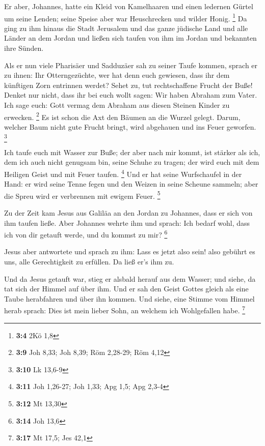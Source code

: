  Er aber, Johannes, hatte ein Kleid von Kamelhaaren und
einen ledernen Gürtel um seine Lenden; seine Speise aber war
Heuschrecken und wilder Honig. \footnote{\textbf{3:4} 2Kö 1,8}
 Da ging zu ihm hinaus die Stadt Jerusalem und das ganze
jüdische Land und alle Länder an dem Jordan  und ließen
sich taufen von ihm im Jordan und bekannten ihre Sünden.

 Als er nun viele Pharisäer und Sadduzäer sah zu seiner
Taufe kommen, sprach er zu ihnen: Ihr Otterngezüchte, wer hat denn euch
gewiesen, dass ihr dem künftigen Zorn entrinnen werdet? 
Sehet zu, tut rechtschaffene Frucht der Buße!  Denket nur
nicht, dass ihr bei euch wollt sagen: Wir haben Abraham zum Vater. Ich
sage euch: Gott vermag dem Abraham aus diesen Steinen Kinder zu
erwecken. \footnote{\textbf{3:9} Joh 8,33; Joh 8,39; Röm 2,28-29; Röm
  4,12}  Es ist schon die Axt den Bäumen an die Wurzel
gelegt. Darum, welcher Baum nicht gute Frucht bringt, wird abgehauen und
ins Feuer geworfen. \footnote{\textbf{3:10} Lk 13,6-9}

 Ich taufe euch mit Wasser zur Buße; der aber nach mir
kommt, ist stärker als ich, dem ich auch nicht genugsam bin, seine
Schuhe zu tragen; der wird euch mit dem Heiligen Geist und mit Feuer
taufen. \footnote{\textbf{3:11} Joh 1,26-27; Joh 1,33; Apg 1,5; Apg
  2,3-4}  Und er hat seine Wurfschaufel in der Hand: er
wird seine Tenne fegen und den Weizen in seine Scheune sammeln; aber die
Spreu wird er verbrennen mit ewigem Feuer. \footnote{\textbf{3:12} Mt
  13,30}

 Zu der Zeit kam Jesus aus Galiläa an den Jordan zu
Johannes, dass er sich von ihm taufen ließe.  Aber
Johannes wehrte ihm und sprach: Ich bedarf wohl, dass ich von dir
getauft werde, und du kommst zu mir? \footnote{\textbf{3:14} Joh 13,6}

 Jesus aber antwortete und sprach zu ihm: Lass es jetzt
also sein! also gebührt es uns, alle Gerechtigkeit zu erfüllen. Da ließ
er's ihm zu.

 Und da Jesus getauft war, stieg er alsbald herauf aus
dem Wasser; und siehe, da tat sich der Himmel auf über ihm. Und er sah
den Geist Gottes gleich als eine Taube herabfahren und über ihn kommen.
 Und siehe, eine Stimme vom Himmel herab sprach: Dies ist
mein lieber Sohn, an welchem ich Wohlgefallen habe. \footnote{\textbf{3:17}
  Mt 17,5; Jes 42,1}

